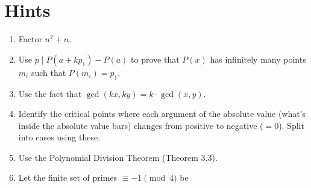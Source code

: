 \chapter{Hints}

\begin{enumerate}[label=\textbf{H\arabic*.}]
    \item Factor $n^2 + n$.
    \item Use $p \mid P(a + kp_1) - P(a)$ to prove that $P(x)$ has infinitely many points $m_i$ such that $P(m_i) = p_1$.
    \item Use the fact that $\gcd(kx, ky) = k \cdot \gcd(x, y)$.
    \item Identify the critical points where each argument of the absolute value (what's inside the absolute value bars) changes from positive to negative ($=0$). Split into cases using these.
    \item Use the Polynomial Division Theorem (Theorem 3.3). 
    \item Let the finite set of primes $\equiv -1 \pmod{4}$ be 
    

\end{enumerate}
